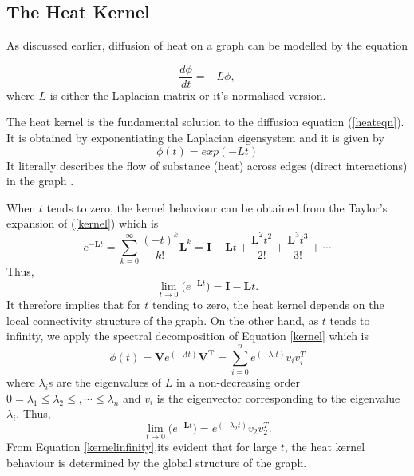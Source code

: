\documentclass[10pt,a4paper]{article}
\begin{document}
        \subsection{The Heat Kernel}
        As discussed earlier, diffusion of heat on a graph can be modelled by the equation 
        
        \begin{equation}
        \frac{d \phi}{dt} = -L \phi,
        \label{heateqn}
        \end{equation}
        where $L$ is either the Laplacian matrix or it's normalised version. 
        
        The heat kernel is the fundamental solution to the diffusion equation (\ref{heateqn}). It is obtained by exponentiating the Laplacian eigensystem and it is given by
        \begin{equation}
        \phi(t) = exp(-Lt) 
        \label{kernel}
        \end{equation}
        It literally describes the flow of substance (heat) across edges (direct interactions) in the graph \citep{xiao2009graph}.
       
        When $t$ tends to zero, the kernel behaviour can be obtained from the Taylor's expansion of (\ref{kernel}) which is 
        \begin{equation}
        e^{-\mathbf{L}t} = \sum_{k=0}^{\infty} \frac{(-t)^k}{k!} \mathbf{L}^k = \mathbf{I} -\mathbf{L}t + \frac{\mathbf{L}^2 t^2}{2!} + \frac{\mathbf{L}^3 t^3}{3!}+ \cdots
        \end{equation}
        Thus,
        \begin{equation}
        \lim_{t\longrightarrow 0} \Big(e^{-\mathbf{L}t}\Big) = \mathbf{I} - \mathbf{L}t.
        \label{kerneltozero}
        \end{equation}
        It therefore implies that for $t$ tending to zero, the heat kernel depends on the local connectivity structure of the graph.
        On the other hand, as $t$ tends to infinity, we apply the spectral decomposition of Equation \ref{kernel} which is 
        \begin{equation}
        \phi(t) = \mathbf{V} e^{(-\Lambda t)} \mathbf{V^T} =  \sum_{i=0}^n e^{(-\lambda_i t)} v_i v_i^T 
        \end{equation}
        where $\lambda_i$s are the eigenvalues of $L$ in a non-decreasing order $0=\lambda_1 \leq  \lambda_2 \leq, \cdots \leq \lambda_n$ and $v_i$ is the eigenvector corresponding to the eigenvalue $\lambda_i$. Thus,
        \begin{equation}
        \lim_{t\longrightarrow 0} \Big(e^{-\mathbf{L}t}\Big) = e^{(-\lambda_2 t)} v_2 v_2^T.
        \label{kernelinfinity}  
        \end{equation}
        From Equation \ref{kernelinfinity},its evident that for large $t$, the heat kernel behaviour is determined by the global structure of the graph. 
\end{document}
